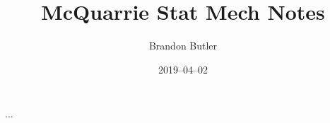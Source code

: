 \documentclass{report}
\title{McQuarrie Stat Mech Notes}
\author{Brandon Butler}
\date{2019--04--02}
\begin{document}
$\dots$
\end{document}
